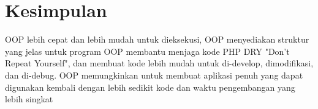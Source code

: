 \documentclass[a4paper]{article}
\begin{document}

  \newpage
  \section{Kesimpulan}
    OOP lebih cepat dan lebih mudah untuk dieksekusi, OOP menyediakan struktur yang jelas untuk program OOP membantu menjaga kode PHP DRY "Don't Repeat Yourself", dan membuat kode lebih mudah untuk di-develop, dimodifikasi, dan di-debug. OOP memungkinkan untuk membuat aplikasi penuh yang dapat digunakan kembali dengan lebih sedikit kode dan waktu pengembangan yang lebih singkat \cite{w3php}



  \newpage

  \nocite{bkpmphp}
  \nocite{Austin2019}

  \begin{center}
  \printbibliography[heading=bibintoc,title={Daftar Pustaka}]
  \end{center}





\end{document}
